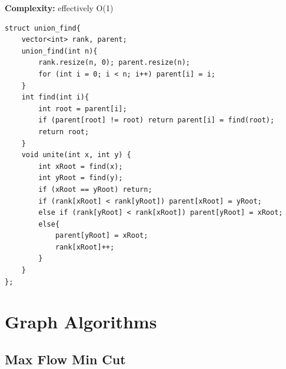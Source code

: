 \documentclass[10pt,a4paper]{article}
\begin{document}
\textbf{Complexity:} effectively O(1)
\begin{verbatim}
struct union_find{
    vector<int> rank, parent;
    union_find(int n){
        rank.resize(n, 0); parent.resize(n);
        for (int i = 0; i < n; i++) parent[i] = i;
    }
    int find(int i){
        int root = parent[i];
        if (parent[root] != root) return parent[i] = find(root);
        return root;
    }
    void unite(int x, int y) {
        int xRoot = find(x);
        int yRoot = find(y);
        if (xRoot == yRoot) return;
        if (rank[xRoot] < rank[yRoot]) parent[xRoot] = yRoot;
        else if (rank[yRoot] < rank[xRoot]) parent[yRoot] = xRoot;
        else{
            parent[yRoot] = xRoot;
            rank[xRoot]++;
        }
    }
};
\end{verbatim}

\section{Graph Algorithms}

\subsection{Max Flow Min Cut}
\end{document}
